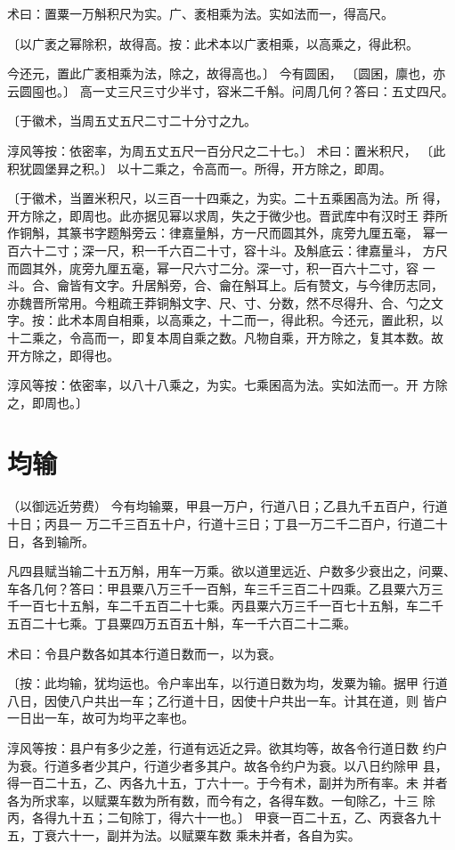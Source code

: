 \documentclass[12pt,UTF8]{ctexbook}
\begin{document}
术曰：置粟一万斛积尺为实。广、袤相乘为法。实如法而一，得高尺。

〔以广袤之幂除积，故得高。按：此术本以广袤相乘，以高乘之，得此积。

今还元，置此广袤相乘为法，除之，故得高也。〕 今有圆囷， 〔圆囷，廪也，亦云圆囤也。〕 高一丈三尺三寸少半寸，容米二千斛。问周几何？答曰：五丈四尺。

〔于徽术，当周五丈五尺二寸二十分寸之九。

淳风等按：依密率，为周五丈五尺一百分尺之二十七。〕 术曰：置米积尺， 〔此积犹圆堡昪之积。〕 以十二乘之，令高而一。所得，开方除之，即周。

〔于徽术，当置米积尺，以三百一十四乘之，为实。二十五乘囷高为法。所 得，开方除之，即周也。此亦据见幂以求周，失之于微少也。晋武库中有汉时王 莽所作铜斛，其篆书字题斛旁云：律嘉量斛，方一尺而圆其外，庣旁九厘五毫， 幂一百六十二寸；深一尺，积一千六百二十寸，容十斗。及斛底云：律嘉量斗， 方尺而圆其外，庣旁九厘五毫，幂一尺六寸二分。深一寸，积一百六十二寸，容 一斗。合、龠皆有文字。升居斛旁，合、龠在斛耳上。后有赞文，与今律历志同， 亦魏晋所常用。今粗疏王莽铜斛文字、尺、寸、分数，然不尽得升、合、勺之文 字。按：此术本周自相乘，以高乘之，十二而一，得此积。今还元，置此积，以 十二乘之，令高而一，即复本周自乘之数。凡物自乘，开方除之，复其本数。故 开方除之，即得也。

淳风等按：依密率，以八十八乘之，为实。七乘囷高为法。实如法而一。开 方除之，即周也。〕 

\chapter{均输}
（以御远近劳费） 今有均输粟，甲县一万户，行道八日；乙县九千五百户，行道十日；丙县一 万二千三百五十户，行道十三日；丁县一万二千二百户，行道二十日，各到输所。

凡四县赋当输二十五万斛，用车一万乘。欲以道里远近、户数多少衰出之，问粟、 车各几何？答曰：甲县粟八万三千一百斛，车三千三百二十四乘。乙县粟六万三 千一百七十五斛，车二千五百二十七乘。丙县粟六万三千一百七十五斛，车二千 五百二十七乘。丁县粟四万五百五十斛，车一千六百二十二乘。

术曰：令县户数各如其本行道日数而一，以为衰。

〔按：此均输，犹均运也。令户率出车，以行道日数为均，发粟为输。据甲 行道八日，因使八户共出一车；乙行道十日，因使十户共出一车。计其在道，则 皆户一日出一车，故可为均平之率也。

淳风等按：县户有多少之差，行道有远近之异。欲其均等，故各令行道日数 约户为衰。行道多者少其户，行道少者多其户。故各令约户为衰。以八日约除甲 县，得一百二十五，乙、丙各九十五，丁六十一。于今有术，副并为所有率。未 并者各为所求率，以赋粟车数为所有数，而今有之，各得车数。一旬除乙，十三 除丙，各得九十五；二旬除丁，得六十一也。〕 甲衰一百二十五，乙、丙衰各九十五，丁衰六十一，副并为法。以赋粟车数 乘未并者，各自为实。
\end{document}
